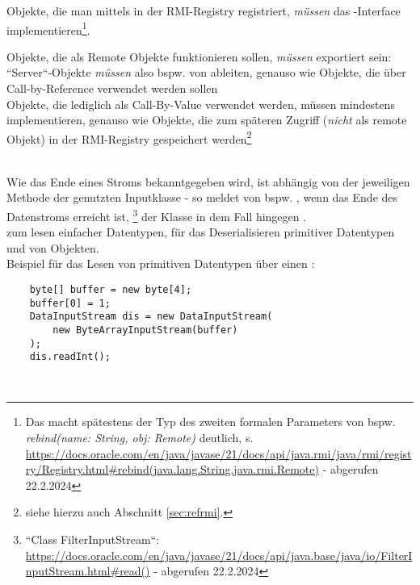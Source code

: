 \noindent
Objekte, die man mittels   in der RMI-Registry registriert, \textit{müssen} das -Interface implementieren\footnote{
Das macht spätestens der Typ des zweiten formalen Parameters von bspw. \textit{rebind(name: String, obj: Remote)} deutlich, s. \url{https://docs.oracle.com/en/java/javase/21/docs/api/java.rmi/java/rmi/registry/Registry.html#rebind(java.lang.String,java.rmi.Remote)} - abgerufen 22.2.2024
}.

\begin{tcolorbox}
Objekte, die als Remote Objekte funktionieren sollen, \textit{müssen} exportiert sein: ``Server``-Objekte \textit{müssen} also bspw. von  ableiten, genauso wie Objekte, die über Call-by-Reference verwendet werden sollen\\

    \noindent
    Objekte, die lediglich als Call-By-Value verwendet werden, müssen mindestens  implementieren, genauso wie Objekte, die zum späteren Zugriff (\textit{nicht} als remote Objekt) in der RMI-Registry gespeichert werden\footnote{
        siehe hierzu auch Abschnitt \ref{sec:refrmi}.
}
\end{tcolorbox}\\

\noindent
Wie das Ende eines Stroms bekanntgegeben wird, ist abhängig von der jeweiligen Methode der genutzten Inputklasse - so meldet  von  bspw. , wenn das Ende des Datenstroms erreicht ist, \footnote{
    ``Class FilterInputStream``: \url{https://docs.oracle.com/en/java/javase/21/docs/api/java.base/java/io/FilterInputStream.html#read()} - abgerufen 22.2.2024
} der Klasse  in dem Fall hingegen .\\

\noindent
{} zum lesen einfacher Datentypen,  für das Deserialisieren primitiver Datentypen und von Objekten.\\

\noindent
Beispiel für das Lesen von primitiven Datentypen über einen :

\begin{verbatim}
    byte[] buffer = new byte[4];
    buffer[0] = 1;
    DataInputStream dis = new DataInputStream(
        new ByteArrayInputStream(buffer)
    );
    dis.readInt();
\end{verbatim}\\

